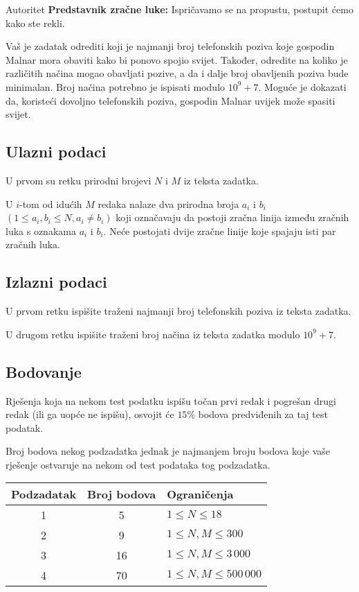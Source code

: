 \begin{statement}[
  problempoints=100,
  timelimit=1 sekunda,
  memorylimit=512 MiB,
]{Autoritet}
\textbf{Predstavnik zračne luke:} Ispričavamo se na propustu, postupit ćemo
  kako ste rekli.

Vaš je zadatak odrediti koji je najmanji broj telefonskih poziva koje gospodin
Malnar mora obaviti kako bi ponovo spojio svijet. Također, odredite na koliko
je različitih načina mogao obavljati pozive, a da i dalje broj obavljenih
poziva bude minimalan. Broj načina potrebno je ispisati modulo $10^9 + 7$.
Moguće je dokazati da, koristeći dovoljno telefonskih poziva, gospodin Malnar
uvijek može spasiti svijet.

\subsection*{Ulazni podaci}
U prvom su retku prirodni brojevi $N$ i $M$ iz teksta zadatka.

U $i$-tom od idućih $M$ redaka nalaze dva prirodna broja $a_i$ i $b_i$ $(1 \le
a_i, b_i \le N, a_i \ne b_i)$ koji označavaju da postoji zračna linija između
zračnih luka s oznakama $a_i$ i $b_i$. Neće postojati dvije zračne linije
koje spajaju isti par zračnih luka.

\subsection*{Izlazni podaci}
U prvom retku ispišite traženi najmanji broj telefonskih poziva iz teksta
zadatka.

U drugom retku ispišite traženi broj načina iz teksta zadatka modulo $10^9 + 7$.

\clearpage
\subsection*{Bodovanje}
Rješenja koja na nekom test podatku ispišu točan prvi redak i pogrešan drugi
redak (ili ga uopće ne ispišu), osvojit će $15\%$ bodova predviđenih za taj
test podatak.

Broj bodova nekog podzadatka jednak je najmanjem broju bodova koje vaše rješenje
ostvaruje na nekom od test podataka tog podzadatka.

{\renewcommand{\arraystretch}{1.4}
  \setlength{\tabcolsep}{6pt}
  \begin{tabular}{ccl}
 Podzadatak & Broj bodova & Ograničenja \\ \midrule
  1 & 5 & $1 \leq N \leq 18$ \\
  2 & 9 & $1 \leq N, M \leq 300$ \\
  3 & 16 & $1 \leq N, M \leq 3\,000$ \\
  4 & 70 & $1 \leq N, M \leq 500\,000$ \\
\end{tabular}}


\end{statement}

